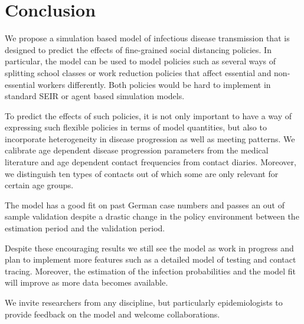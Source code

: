 \section{Conclusion}
\label{sec:conclusion}

We propose a simulation based model of infectious disease transmission that is designed
to predict the effects of fine-grained social distancing policies. In particular, the
model can be used to model policies such as several ways of splitting school classes or
work reduction policies that affect essential and non-essential workers differently.
Both policies would be hard to implement in standard SEIR or agent based simulation
models.

To predict the effects of such policies, it is not only important to have a way of
expressing such flexible policies in terms of model quantities, but also to incorporate
heterogeneity in disease progression as well as meeting patterns. We calibrate age
dependent disease progression parameters from the medical literature and age dependent
contact frequencies from contact diaries. Moreover, we distinguish ten types of contacts
out of which some are only relevant for certain age groups.

The model has a good fit on past German case numbers and passes an out of sample
validation despite a drastic change in the policy environment between the estimation
period and the validation period.

Despite these encouraging results we still see the model as work in progress and plan to
implement more features such as a detailed model of testing and contact tracing.
Moreover, the estimation of the infection probabilities and the model fit will improve
as more data becomes available.

We invite researchers from any discipline, but particularly epidemiologists to provide
feedback on the model and welcome collaborations.
